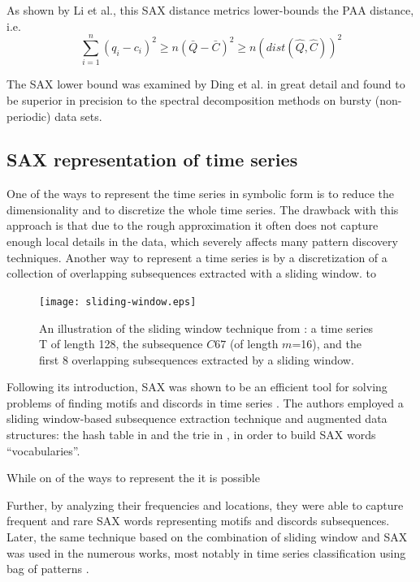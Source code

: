 As shown by Li et al., this SAX distance metrics lower-bounds the PAA distance, i.e.
\begin{equation}
\sum_{i=1}^{n} (q_{i} - c_{i})^{2} \geq n(\bar{Q} - \bar{C})^{2} \geq n(dist(\hat{Q},\hat{C}))^2
\label{eq:sax_bounding}
\end{equation}

The SAX lower bound was examined by Ding et al. \cite{citeulike:4501572} in great detail and found to be 
superior in precision to the spectral decomposition methods on bursty (non-periodic) data sets.

\subsection{SAX representation of time series}\label{sec_sax_representation}
One of the ways to represent the time series in symbolic form is to reduce the dimensionality and to 
discretize the whole time series. The drawback with this approach is that due to the rough approximation 
it often does not capture enough local details in the data, which severely affects many pattern discovery
techniques. 
Another way to represent a time series is by a discretization of a collection of overlapping subsequences 
extracted with a sliding window. to 

\begin{figure}[tbp]
   \centering
   \texttt{[image: sliding-window.eps]}
   \caption{An illustration of the sliding window technique from \cite{citeulike:2821475}: a time series T of length 128, 
   the subsequence $C67$ (of length $m$=16), and the first 8 overlapping subsequences extracted by a sliding window.}
   \label{fig:sliding_window}
\end{figure}

Following its introduction, SAX was shown to be an efficient tool for solving problems of finding motifs 
and discords in time series \cite{citeulike:3977965} \cite{citeulike:3175749}. 
The authors employed a sliding window-based subsequence extraction technique and augmented data 
structures: the hash table in \cite{citeulike:3977965} and the trie in \cite{citeulike:3175749},
in order to build SAX words ``vocabularies''.

While on of the ways to represent the it is possible 

Further, by analyzing their frequencies and locations, they were able to capture frequent and rare SAX 
words representing motifs and discords subsequences. 
Later, the same technique based on the combination of sliding window and SAX was used in the numerous 
works, most notably in time series classification using bag of patterns \cite{citeulike:10525778}. 

